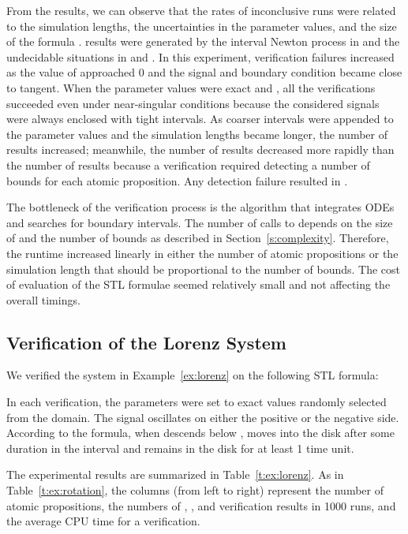 \documentclass[paper]{ieice}
\begin{document}
From the results, we can observe that the rates of inconclusive runs were related to the simulation lengths, the uncertainties in the parameter values, and the size of the formula .
 results were generated by the interval Newton process in  and the undecidable situations in  and . In this experiment, verification failures increased as the value of  approached 0 and the signal and boundary condition became close to tangent.
When the parameter values were exact and , all the verifications succeeded even under near-singular conditions because the considered signals were always enclosed with tight intervals.
As coarser intervals were appended to the parameter values and the simulation lengths became longer, the number of  results increased; meanwhile, the number of  results decreased more rapidly than the number of  results because a  verification required detecting a number of bounds for each atomic proposition. Any detection failure resulted in .

The bottleneck of the verification process is the  algorithm that integrates ODEs and searches for boundary intervals. The number of calls to  depends on the size of  and the number of bounds as described in Section~\ref{s:complexity}.
Therefore, the runtime increased linearly in either the number of atomic propositions or the simulation length that should be proportional to the number of bounds.
The cost of evaluation of the STL formulae seemed relatively small and not affecting the overall timings.


\subsection{Verification of the Lorenz System}

We verified the system in Example~\ref{ex:lorenz} on the following STL formula:

In each verification, the parameters were set to exact values randomly selected from the domain.
The signal  oscillates on either the positive or the negative side. According to the formula, when  descends below ,  moves into the disk  after some duration in the interval  and remains in the disk for at least 1 time unit.

The experimental results are summarized in Table~\ref{t:ex:lorenz}.
As in Table~\ref{t:ex:rotation}, the columns (from left to right) represent the number of atomic propositions, the numbers of , , and  verification results in 1000 runs, and the average CPU time for a  verification.
\end{document}
